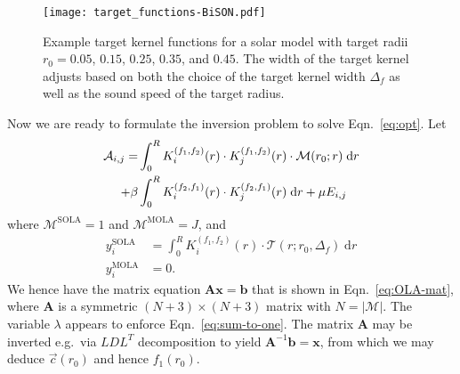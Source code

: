 \documentclass[twocolumn,twocolappendix]{aastex6}
\begin{document}
\begin{figure}
    \texttt{[image: target\_functions-BiSON.pdf]}
    \caption{Example target kernel functions for a solar model with target radii $r_0 = 0.05$, $0.15$, $0.25$, $0.35$, and $0.45$. The width of the target kernel adjusts based on both the choice of the target kernel width $\Delta_f$ as well as the sound speed of the target radius. \label{fig:target-kerns} }  
\end{figure}

Now we are ready to formulate the inversion problem to solve Eqn.~\ref{eq:opt}. Let 
\begin{align}
    \mathcal{A}_{i,j} 
    = 
    &\int_0^R K_i^{(f_1, f_2)}(r) \cdot K_j^{(f_1, f_2)}(r) \cdot 
    \mathcal{M}(r_0; r)\; \text{d}r
\notag\\+ \beta &\int_0^R K_i^{(f_2, f_1)}(r) \cdot K_j^{(f_2, f_1)}(r) \; \text{d}r 
  + \mu E_{i,j}
\end{align}
where $\mathcal{M}^{\text{SOLA}}=1$ and $\mathcal{M}^{\text{MOLA}} = J$, and
\begin{align}
        y_i^{\text{SOLA}} &= \int_0^R K_i^{(f_1, f_2)}(r) \cdot \mathcal{T}(r; r_0, \Delta_f) \; \text{d}r
\\      y_i^{\text{MOLA}} &= 0.
\end{align}
We hence have the matrix equation $\mathbf{A}\mathbf{x} = \mathbf{b}$ that is shown in Eqn.~\ref{eq:OLA-mat}, where $\mathbf{A}$ is a symmetric $(N+3)\times (N+3)$ matrix with $N=|\mathscr{M}|$. The variable $\lambda$ appears to enforce Eqn.~\ref{eq:sum-to-one}. The matrix $\mathbf{A}$ may be inverted e.g.~via $LDL^T$ decomposition to yield $\mathbf{A}^{-1}\mathbf{b}=\mathbf{x}$, from which we may deduce $\vec c(r_0)$ and hence $f_1(r_0)$. 
\end{document}

